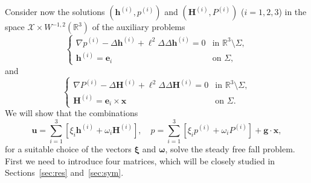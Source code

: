 \documentclass[final]{amsart}
\theoremstyle{definition}
\theoremstyle{definition}
\theoremstyle{remark}
\begin{document}
Consider now the solutions $({\boldsymbol h}^{(i)},p^{(i)})$ and $({\boldsymbol H}^{(i)},P^{(i)})$ ($i=1,2,3$) in the space $\mathcal{X}\times W^{-1,2}({\mathbb R}^3)$ of
the auxiliary problems
\begin{equation}
\label{eq:aux1}
\begin{cases}
\nabla p^{(i)}- \Delta {\boldsymbol h}^{(i)} +\ell^2\Delta\Delta{\boldsymbol h}^{(i)}=0 &\text{in }{\mathbb R}^3\setminus{\Sigma},\\
{\boldsymbol h}^{(i)}={\boldsymbol e}_i &\text{on }{\Sigma},
\end{cases}
\end{equation}
and
\begin{equation}
\label{eq:aux2}
\begin{cases}
\nabla P^{(i)}- \Delta {\boldsymbol H}^{(i)} +\ell^2\Delta\Delta {\boldsymbol H}^{(i)}=0 &\text{in }{\mathbb R}^3\setminus{\Sigma},\\
{\boldsymbol H}^{(i)}={\boldsymbol e}_i\times{\boldsymbol x} &\text{on }{\Sigma}.
\end{cases}
\end{equation}
We will show that the combinations
\begin{equation}\label{eq:combination}
{\boldsymbol u}=\sum_{i=1}^3 [\xi_i{\boldsymbol h}^{(i)}+\omega_i{\boldsymbol H}^{(i)}],\quad 
p=\sum_{i=1}^3 [\xi_i p^{(i)}+\omega_i P^{(i)}]+{\boldsymbol g}\cdot{\boldsymbol x},
\end{equation}
for a suitable choice of the vectors ${\boldsymbol \xi}$ and ${\boldsymbol \omega}$, solve
the steady free fall problem. First we need to introduce four matrices,
which will be closely studied in Sections~\ref{sec:res}
and~\ref{sec:sym}.
\end{document}
